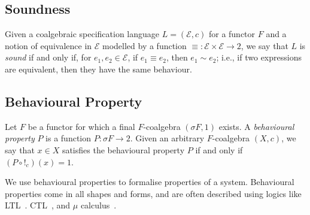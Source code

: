 \subsection{Soundness}
Given a coalgebraic specification language $L=(\mathcal{E},c)$ for a functor $F$ and a notion of equivalence in $\mathcal{E}$ modelled by a function $\equiv \colon \mathcal{E}\times \mathcal{E}\rightarrow 2$, we say that $L$ is \emph{sound} if and only if, for $e_1, e_2\in \mathcal{E}$, if $e_1\equiv e_2$, then $e_1\sim e_2$; i.e., if two expressions are equivalent, then they have the same behaviour.


\subsection{Behavioural Property}
\label{sec:preliminaries:BehaviouralProperty}
Let $F$ be a functor for which a final $F$-coalgebra $(\sigma F, 1)$ exists. A \emph{behavioural property} $P$ is a function $P\colon \sigma F\rightarrow 2$. Given an arbitrary $F$-coalgebra $(X,c)$, we say that $x\in X$ satisfies the behavioural property $P$ if and only if $(P\circ !_c)(x)=1$.

We use {behavioural properties} to formalise properties of a system. Behavioural properties come in all shapes and forms, and are often described using logics like LTL~\cite{LTL}. CTL~\cite{CTL}, and $\mu$ calculus~\cite{MuCalculus}.


